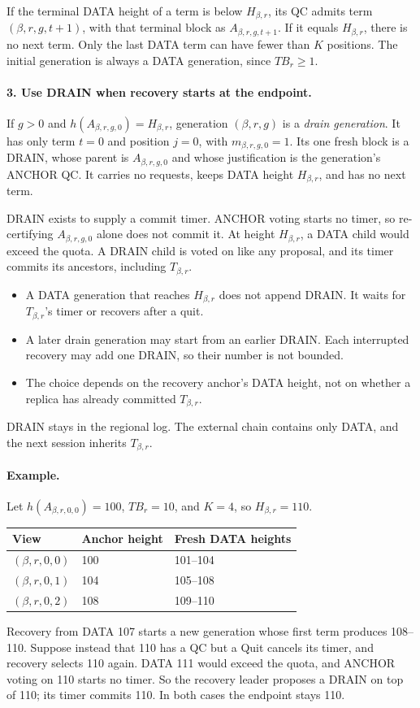 \documentclass[11pt,a4paper]{article}
\newcommand{\TB}{\mathit{TB}}
\newcommand{\defterm}[1]{\textcolor{rrBlue}{\textit{#1}}}
\begin{document}
If the terminal DATA height of a term is below $H_{\beta,r}$, its QC
admits term $(\beta,r,g,t+1)$, with that terminal block as
$A_{\beta,r,g,t+1}$. If it equals $H_{\beta,r}$, there is no next term.
Only the last DATA term can have fewer than $K$ positions. The initial
generation is always a DATA generation, since $\TB_r\ge1$.

\paragraph{3. Use DRAIN when recovery starts at the endpoint.}
If $g>0$ and $h(A_{\beta,r,g,0})=H_{\beta,r}$, generation $(\beta,r,g)$ is
a \defterm{drain generation}. It has only term $t=0$ and position $j=0$,
with $m_{\beta,r,g,0}=1$. Its one fresh block is a DRAIN, whose parent is
$A_{\beta,r,g,0}$ and whose justification is the generation's ANCHOR QC.
It carries no requests, keeps DATA height $H_{\beta,r}$, and has no next
term.

DRAIN exists to supply a commit timer. ANCHOR voting starts no timer, so
re-certifying $A_{\beta,r,g,0}$ alone does not commit it. At height
$H_{\beta,r}$, a DATA child would exceed the quota. A DRAIN child is
voted on like any proposal, and its timer commits its ancestors,
including $T_{\beta,r}$.
\begin{itemize}
\item A DATA generation that reaches $H_{\beta,r}$ does not append DRAIN.
It waits for $T_{\beta,r}$'s timer or recovers after a quit.
\item A later drain generation may start from an earlier DRAIN.
Each interrupted recovery may add one DRAIN, so their number is not
bounded.
\item The choice depends on the recovery anchor's DATA height, not on
whether a replica has already committed $T_{\beta,r}$.
\end{itemize}
DRAIN stays in the regional log. The external chain contains only DATA,
and the next session inherits $T_{\beta,r}$.

\paragraph{Example.}
Let $h(A_{\beta,r,0,0})=100$, $\TB_r=10$, and $K=4$, so $H_{\beta,r}=110$.
\begin{center}\small
\begin{tabular}{@{}lll@{}}\toprule
View & Anchor height & Fresh DATA heights\\\midrule
$(\beta,r,0,0)$ & 100 & 101--104\\
$(\beta,r,0,1)$ & 104 & 105--108\\
$(\beta,r,0,2)$ & 108 & 109--110\\\bottomrule
\end{tabular}
\end{center}
Recovery from DATA 107 starts a new generation whose first term produces
108--110. Suppose instead that 110 has a QC but a Quit cancels its timer,
and recovery selects 110 again. DATA 111 would exceed the quota, and
ANCHOR voting on 110 starts no timer. So the recovery leader proposes a
DRAIN on top of 110; its timer commits 110. In both cases the endpoint
stays 110.
\end{document}
